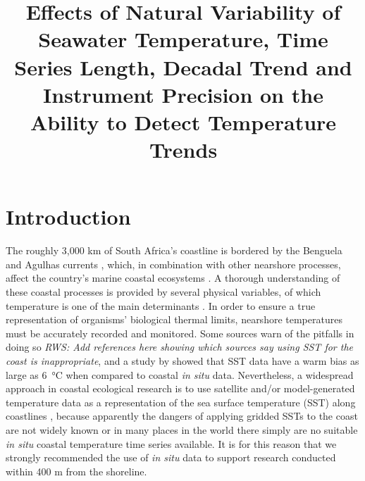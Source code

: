 \documentclass[]{ametsoc}
\title{Effects of Natural Variability of Seawater Temperature, Time Series Length, Decadal Trend and Instrument Precision on the Ability to Detect Temperature Trends}
\affiliation{Department of Biodiversity and Conservation Biology, University of the Western Cape, Bellville, Republic of South Africa}
\begin{document}
\maketitle

\section{Introduction}
The roughly 3,000 km of South Africa's coastline is bordered by the Benguela and Agulhas currents \citep[e.g.][]{Roberts2005,Hutchings2009}, which, in combination with other nearshore processes, affect the country's marine coastal ecosystems \citep{Santos2012a}. A thorough understanding of these coastal processes is provided by several physical variables, of which temperature is one of the main determinants \citep[e.g.][]{Blanchette2008, Tittensor2010, Couce2012}. In order to ensure a true representation of organisms' biological thermal limits, nearshore temperatures must be accurately recorded and monitored. Some sources warn of the pitfalls in doing so \emph{RWS: Add references here showing which sources say using SST for the coast is inappropriate}, and a study by \citet{Smit2013} showed that SST data have a warm bias as large as \SI{6}{\degreeCelsius} when compared to coastal \emph{in situ} data. Nevertheless, a widespread approach in coastal ecological research is to use satellite and/or model-generated temperature data as a representation of the sea surface temperature (SST) along coastlines \citep[e.g.][]{Blanchette2008, Broitman2008a, Tyberghein2012}, because apparently the dangers of applying gridded SSTs to the coast are not widely known or in many places in the world there simply are no suitable \emph{in situ} coastal temperature time series available. It is for this reason that we strongly recommended the use of \emph{in situ} data to support research conducted within 400 m from the shoreline.
\end{document}
